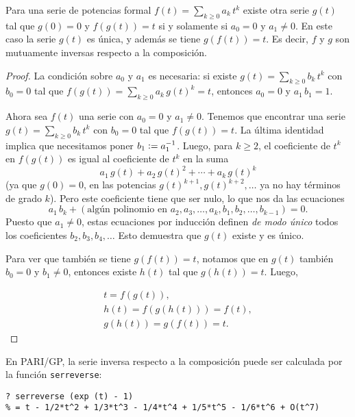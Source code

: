 \documentclass{article}
\begin{document}
\begin{proposicion*}
Para una serie de potencias formal $f (t) = \sum_{k \ge 0} a_k \, t^k$ existe otra serie $g (t)$ tal que $g (0) = 0$ y $f (g (t)) = t$ si y solamente si $a_0 = 0$ y $a_1 \ne 0$. En este caso la serie $g (t)$ es única, y además se tiene $g (f (t)) = t$. Es decir, $f$ y $g$ son mutuamente inversas respecto a la composición.

\begin{proof}
La condición sobre $a_0$ y $a_1$ es necesaria: si existe $g (t) = \sum_{k\ge 0} b_k\,t^k$ con $b_0 = 0$ tal que $f (g (t)) = \sum_{k\ge 0} a_k\,g(t)^k = t$, entonces $a_0 = 0$ y $a_1\,b_1 = 1$.

Ahora sea $f (t)$ una serie con $a_0 = 0$ y $a_1 \ne 0$. Tenemos que encontrar una serie $g (t) = \sum_{k \ge 0} b_k\,t^k$ con $b_0 = 0$ tal que $f (g (t)) = t$. La última identidad implica que necesitamos poner $b_1 \mathrel{\mathop:}= a_1^{-1}$. Luego, para $k \ge 2$, el coeficiente de $t^k$ en $f (g (t))$ es igual al coeficiente de $t^k$ en la suma
$$a_1 \, g (t) + a_2 \, g (t)^2 + \cdots + a_k \, g(t)^k$$
(ya que $g (0) = 0$, en las potencias $g (t)^{k+1}, g (t)^{k+2}, \ldots$ ya no hay términos de grado $k$). Pero este coeficiente tiene que ser nulo, lo que nos da las ecuaciones
$$a_1\,b_k + (\text{algún polinomio en }a_2, a_3, \ldots, a_k, b_1, b_2, \ldots, b_{k-1}) = 0.$$
Puesto que $a_1 \ne 0$, estas ecuaciones por inducción definen \emph{de modo único} todos los coeficientes $b_2, b_3, b_4, \ldots$ Esto demuestra que $g (t)$ existe y es único.

Para ver que también se tiene $g (f (t)) = t$, notamos que en $g (t)$ también $b_0 = 0$ y $b_1 \ne 0$, entonces existe $h (t)$ tal que $g (h (t)) = t$. Luego,

\begin{gather*}
t = f (g (t)),\\
h (t) = f (g (h (t))) = f (t),\\
g (h (t)) = g (f (t)) = t.
\end{gather*}
\end{proof}
\end{proposicion*}

\begin{shaded}
\noindent\small En PARI/GP, la serie inversa respecto a la composición puede ser calculada por la función \verb|serreverse|:

\begin{verbatim}
? serreverse (exp (t) - 1)
% = t - 1/2*t^2 + 1/3*t^3 - 1/4*t^4 + 1/5*t^5 - 1/6*t^6 + O(t^7)
\end{verbatim}
\end{shaded}
\end{document}
